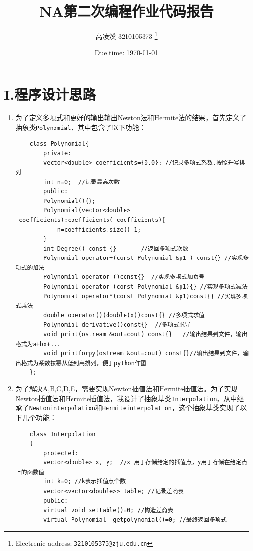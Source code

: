 \documentclass[a4paper]{article}
\begin{document}
\title{NA第二次编程作业代码报告}

\author{高凌溪 3210105373
  \thanks{Electronic address: \texttt{3210105373@zju.edu.cn}}}


\date{Due time: \today}

\maketitle


\section*{I.程序设计思路}
\begin{enumerate}
	\item 为了定义多项式和更好的输出输出Newton法和Hermite法的结果，首先定义了抽象类\lstinline|Polynomial|，其中包含了以下功能：
\begin{lstlisting}
	class Polynomial{
		private:
		vector<double> coefficients={0.0}; //记录多项式系数,按照升幂排列
		int n=0;  //记录最高次数
		public:
		Polynomial(){};
		Polynomial(vector<double> _coefficients):coefficients(_coefficients){
			n=coefficients.size()-1;
		}
		int Degree() const {} 		//返回多项式次数
		Polynomial operator+(const Polynomial &p1 ) const{}	//实现多项式的加法
		Polynomial operator-()const{}  //实现多项式加负号
		Polynomial operator-(const Polynomial &p1){} //实现多项式减法
		Polynomial operator*(const Polynomial &p1)const{} //实现多项式乘法
		double operator()(double(x))const{} //多项式求值
		Polynomial derivative()const{}  //多项式求导
		void print(ostream &out=cout) const{} 	//输出结果到文件，输出格式为a+bx+...
        void printforpy(ostream &out=cout) const{}//输出结果到文件，输出格式为系数按幂从低到高排列，便于python作图
	};
\end{lstlisting}
	\item
	为了解决A,B,C,D,E，需要实现Newton插值法和Hermite插值法。为了实现Newton插值法和Hermite插值法，我设计了抽象基类\lstinline|Interpolation|，从中继承了\lstinline|Newtoninterpolation|和\lstinline|Hermiteinterpolation|，这个抽象基类实现了以下几个功能：
\begin{lstlisting}
	class Interpolation
	{
		protected:
		vector<double> x, y;  //x 用于存储给定的插值点，y用于存储在给定点上的函数值
		int k=0; //k表示插值点个数
		vector<vector<double>> table; //记录差商表
		public:
		virtual void settable()=0; //构造差商表
		virtual Polynomial  getpolynomial()=0; //最终返回多项式

\end{lstlisting}
\end{enumerate}
\end{document}
